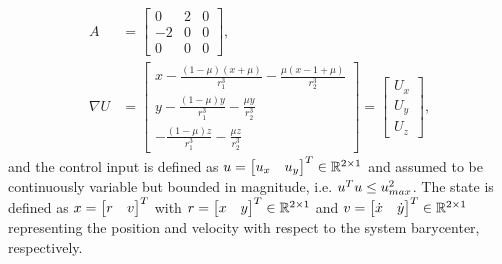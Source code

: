 \begin{align}
    A &= \left[ \begin{array}{ccc} 0 & 2 & 0 \\ -2 & 0 & 0 \\ 0 & 0 & 0 \end{array} \right], \label{eq:A_mat} \\
    \nabla U &= \left[ \begin{array}{c} x - \frac{ \left(1 - \mu\right) \left(x + \mu\right)}{r_1^3} - \frac{\mu \left( x - 1 + \mu \right)}{r_2^3} \\
                                                                                        y - \frac{ \left(1 - \mu\right) y}{r_1^3} - \frac{\mu y}{r_2^3} \\
                                                                                        - \frac{ \left(1 - \mu\right) z}{r_1^3} - \frac{\mu z}{r_2^3}\end{array}\right]
                                        = \left[\begin{array}{c} U_x \\ U_y \\ U_z\end{array} \right] , \label{eq:grav_pot}
\end{align}
and the control input is defined as \( u = \begin{bmatrix} u_x & u_y \end{bmatrix}^T \in \mathbb{R}^{2\times1} \) and assumed to be continuously variable but bounded in magnitude, i.e. \( u^T u \leq u_{max}^2 \).
The state is defined as \( x = \begin{bmatrix}r &v \end{bmatrix}^T\) with \(r = \begin{bmatrix} x & y \end{bmatrix}^T \in \mathbb{R}^{2\times1}\) and \(v= \begin{bmatrix} \dot{x} & \dot{y} \end{bmatrix}^T \in \mathbb{R}^{2\times1}\) representing the position and velocity with respect to the system barycenter, respectively.

